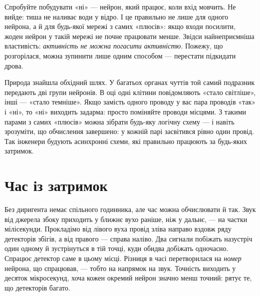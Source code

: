 Спробуйте побудувати «ні» --- нейрон, який працює, коли вхід мовчить. Не вийде: тиша не наливає води у відро. І це правильно не лише для одного нейрона, а й для будь-якої мережі з самих «плюсів»: якщо входи посилити, жоден нейрон у такій мережі не почне працювати менше. Звідси найнеприємніша властивість: \emph{активність не можна погасити активністю}. Пожежу, що розгорілася, можна зупинити лише одним способом --- перестати підкидати дрова.

Природа знайшла обхідний шлях. У багатьох органах чуттів той самий подразник передають дві групи нейронів. В оці одні клітини повідомляють «стало світліше», інші --- «стало темніше». Якщо замість одного проводу у вас пара проводів «так» і «ні», то «ні» виходить задарма: просто поміняйте проводи місцями. З такими парами з самих «плюсів» можна зібрати будь-яку логічну схему --- і навіть зрозуміти, що обчислення завершено: у кожній парі засвітився рівно один провід. Так інженери будують асинхронні схеми, які правильно працюють за будь-яких затримок.

\section*{Час із затримок}

Без диригента немає спільного годинника, але час можна обчислювати й так. Звук від джерела збоку приходить у ближнє вухо раніше, ніж у дальнє, --- на частки мілісекунди. Прокладімо від лівого вуха провід зліва направо вздовж ряду детекторів збігів, а від правого --- справа наліво. Два сигнали побіжать назустріч один одному й зустрінуться в тій точці, куди обидва добіжать одночасно. Спрацює детектор саме в цьому місці. Різниця в часі перетворилася на \emph{номер} нейрона, що спрацював, --- тобто на напрямок на звук. Точність виходить у десяток мікросекунд, хоча кожен окремий нейрон значно менш точний: рятує те, що детекторів багато.


